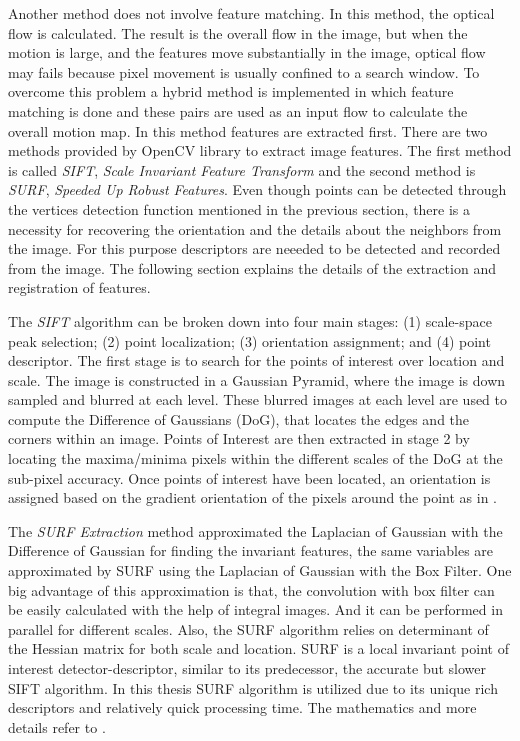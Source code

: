 Another method does not involve feature matching. In this method, the optical flow is calculated. The result is the overall flow in the image, but when the motion is large, and the features move substantially in the image, optical flow may fails because pixel movement is usually confined to a search window.  To overcome this problem a hybrid method is implemented in which feature matching is done and these pairs are used as an input flow to calculate the overall motion map. In this method features are extracted first. There are two methods provided by OpenCV library to extract image features. The first method is called \textit{SIFT}, \textit{Scale Invariant Feature Transform} and the second method is \textit{SURF}, \textit{Speeded Up Robust Features}. Even though points can be detected through the vertices detection function mentioned in the previous section, there is a necessity for  recovering the orientation and the details about the neighbors from the image. For this purpose descriptors are neeeded to be detected and recorded from the image. The following section explains the details of the extraction and registration of features. 

The \textit{SIFT} algorithm can be broken down into four main stages: (1) scale-space peak
selection; (2) point localization; (3) orientation assignment; and (4) point descriptor. The first
stage is to search for the points of interest over location and scale. The image is constructed in a
Gaussian Pyramid, where the image is down sampled and blurred at each level. These
blurred images at each level are used to compute the Difference of Gaussians (DoG), that
locates the edges and the corners within an image. Points of Interest are then extracted in stage 2 by
locating the maxima/minima pixels within the different scales of the DoG at the sub-pixel accuracy.
Once points of interest have been located, an orientation is assigned based on the gradient
orientation of the pixels around the point as in \cite{lowe2004distinctive}.

The \textit{SURF Extraction} method approximated the Laplacian of Gaussian with the Difference of Gaussian for finding the invariant features, the same variables are approximated by SURF using the Laplacian of Gaussian with the Box Filter. One big advantage of this approximation is that, the convolution with box filter can be easily calculated with the help of integral images. And it can be performed in parallel for different scales. Also, the SURF algorithm relies on determinant of the Hessian matrix for both scale and location. SURF is a local invariant point of interest detector-descriptor, similar to its predecessor, the accurate but slower SIFT algorithm. In this thesis SURF algorithm is utilized due to its unique rich descriptors and relatively quick processing time. The mathematics and more details refer to \cite{bay2008speeded}.


